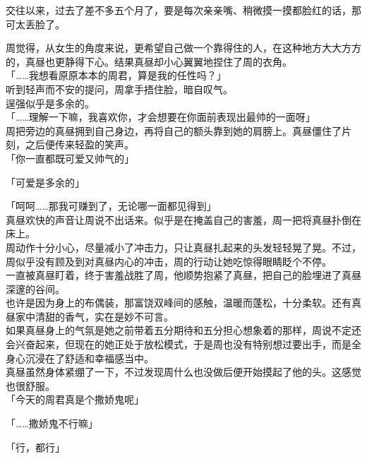 交往以来，过去了差不多五个月了，要是每次亲亲嘴、稍微摸一摸都脸红的话，那可太丢脸了。

周觉得，从女生的角度来说，更希望自己做一个靠得住的人，在这种地方大大方方的，真昼也更静得下心。结果真昼却小心翼翼地捏住了周的衣角。\\

「……我想看原原本本的周君，算是我的任性吗？」\\

听到轻声而不安的提问，周拿手捂住脸，暗自叹气。\\

逞强似乎是多余的。\\

「……理解一下嘛，我喜欢你，才会想要在你面前表现出最帅的一面呀」\\

周把旁边的真昼拥到自己身边，再将自己的额头靠到她的肩膀上。真昼僵住了片刻，之后便传来轻盈的笑声。\\

「你一直都既可爱又帅气的」

「可爱是多余的」

「呵呵……那我可赚到了，无论哪一面都见得到」\\

真昼欢快的声音让周说不出话来。似乎是在掩盖自己的害羞，周一把将真昼扑倒在床上。\\

周动作十分小心，尽量减小了冲击力，只让真昼扎起来的头发轻轻晃了晃。不过，周似乎没有顾及到对真昼内心的冲击，周的行动让她吃惊得眼睛眨个不停。\\

一直被真昼盯着，终于害羞战胜了周，他顺势抱紧了真昼，把自己的脸埋进了真昼深邃的谷间。\\

也许是因为身上的布偶装，那富饶双峰间的感触，温暖而蓬松，十分柔软。还有真昼家中清甜的香气，实在是妙不可言。\\

如果真昼身上的气氛是她之前带着五分期待和五分担心想象着的那样，周说不定还会兴奋起来，但现在的她正处于放松模式，于是周也没有特别想过要出手，而是全身心沉浸在了舒适和幸福感当中。\\

真昼虽然身体紧绷了一下，不过发现周什么也没做后便开始摸起了他的头。这感觉也很舒服。\\

「今天的周君真是个撒娇鬼呢」

「……撒娇鬼不行嘛」

「行，都行」\\

